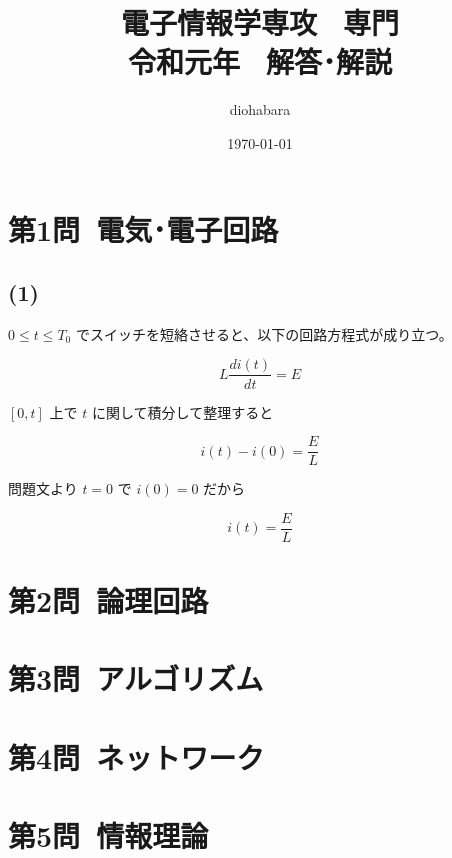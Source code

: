 \documentclass[a4paper,12pt,xelatex,ja=standard]{bxjsarticle}
\title{電子情報学専攻 \, 専門 \\ 令和元年 \, 解答･解説}
\author{diohabara}
\date{\today}
\begin{document}
\maketitle

\section*{第1問\ 電気･電子回路}

\subsection*{(1)}


\(0 \leq t \leq T_0 \) でスイッチを短絡させると、以下の回路方程式が成り立つ。

\[
  L \frac{d i(t)}{d t} = E
\]

\([0, t]\) 上で \(t\) に関して積分して整理すると

\[
  i(t) - i(0) = \frac{E}{L}
\]

問題文より $t = 0$ で $i(0) = 0$ だから

\[
  i(t) = \frac{E}{L}
\]

\section*{第2問\ 論理回路}
\section*{第3問\ アルゴリズム}
\section*{第4問\ ネットワーク}
\section*{第5問\ 情報理論}
\end{document}
